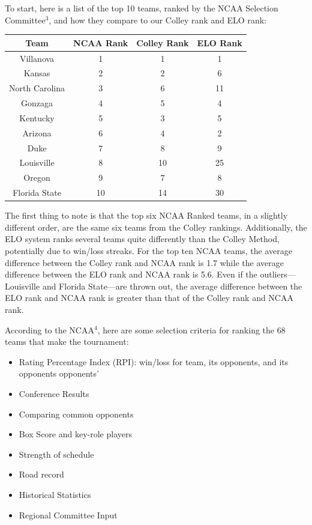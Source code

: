 \documentclass[12pt]{article}
\begin{document}
To start, here is a list of the top 10 teams, ranked by the NCAA Selection Committee$^{3}$, and how they compare to our Colley rank and ELO rank:
\begin{center}
\begin{tabular}{|c|c|c|c|}
\hline
Team & NCAA Rank & Colley Rank & ELO Rank \\
\hline
\hline
Villanova& 1 & 1 & 1\\ \hline
Kansas& 2 & 2 & 6\\ \hline
North Carolina & 3 & 6 & 11 \\ \hline
Gonzaga& 4 & 5 & 4\\ \hline
Kentucky& 5 & 3 & 5\\ \hline
Arizona& 6 & 4 & 2\\ \hline
Duke& 7 & 8 & 9\\ \hline
Louisville& 8 & 10 & 25\\ \hline
Oregon& 9 & 7 & 8\\ \hline
Florida State& 10 & 14 & 30\\ \hline
\end{tabular}
\end{center}
The first thing to note is that the top six NCAA Ranked teams, in a slightly different order, are the same six teams from the Colley rankings. Additionally, the ELO system ranks several teams quite differently than the Colley Method, potentially due to win/loss streaks. For the top ten NCAA teams, the average difference between the Colley rank and NCAA rank is 1.7 while the average difference between the ELO rank and NCAA rank is 5.6. Even if the outliers---Louisville and Florida State---are thrown out, the average difference between the ELO rank and NCAA rank is greater than that of the Colley rank and NCAA rank.

According to the NCAA$^{4}$, here are some selection criteria for ranking the 68 teams that make the tournament:
\begin{itemize}
\item Rating Percentage Index (RPI): win/loss for team, its opponents, and its opponents opponents'
\item Conference Results
\item Comparing common opponents
\item Box Score and key-role players
\item Strength of schedule
\item Road record
\item Historical Statistics
\item Regional Committee Input
\end{itemize}
\end{document}
